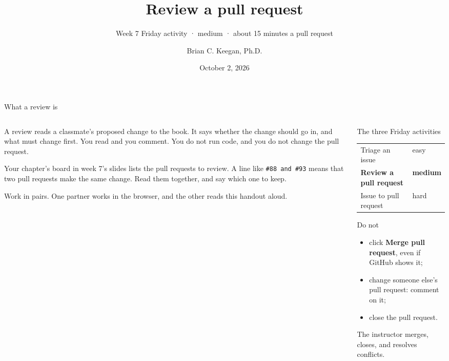 \documentclass{handout}
\title[INFO 4617 · Week 7 · Friday activities · Review a pull request]{Review a pull request}
\subtitle{Week 7 Friday activity · medium · about 15 minutes a pull request}
\author{Brian C. Keegan, Ph.D.}
\institute{Department of Information Science, University of Colorado Boulder}
\date{October 2, 2026}
\begin{document}
\maketitle

\begin{frame}{What a review is}
  \begin{columns}[T]
    \begin{column}{0.57\textwidth}
      A review reads a classmate's proposed change to the book. It says
      whether the change should go in, and what must change first. You read
      and you comment. You do not run code, and you do not change the pull
      request.

      Your chapter's board in week 7's slides lists the pull requests to
      review. A line like \texttt{\#88 and \#93} means that two pull
      requests make the same change. Read them together, and say which one
      to keep.

      Work in pairs. One partner works in the browser, and the other reads
      this handout aloud.
    \end{column}
    \begin{column}{0.39\textwidth}
      \begin{block}{The three Friday activities}
        \small
        \begin{tabular}{@{}ll@{}}
          Triage an issue & easy\\
          \textbf{Review a pull request} & \textbf{medium}\\
          Issue to pull request & hard
        \end{tabular}
      \end{block}
      \begin{alertblock}{Do not}
        \small
        \begin{itemize}
          \item click \textbf{Merge pull request}, even if GitHub shows it;
          \item change someone else's pull request: comment on it;
          \item close the pull request.
        \end{itemize}
        The instructor merges, closes, and resolves conflicts.
      \end{alertblock}
    \end{column}
  \end{columns}
\end{frame}
\end{document}
